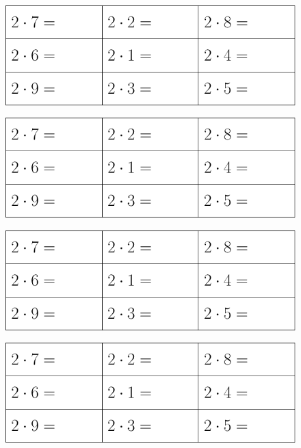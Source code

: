 \newpage
	 \thispagestyle{empty}
\begin{figure}
	\includegraphics[]{g2a}
\end{figure}
\vs
\begin{figure}
	\includegraphics[]{g2a}
\end{figure}		
\vs
\begin{figure}
	\includegraphics[]{g2a}
\end{figure}
\vs
\begin{figure}
	\includegraphics[]{g2a}
\end{figure}
\newpage
			 \thispagestyle{empty}
		
